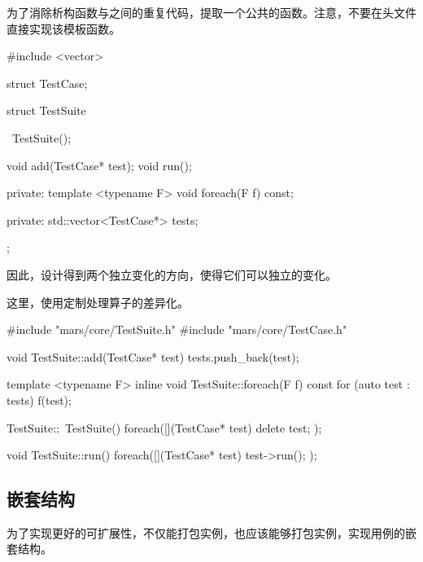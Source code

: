 \begin{content}
为了消除析构函数与之间的重复代码，提取一个公共的函数。注意，不要在头文件直接实现该模板函数。

\begin{leftbar}
 \begin{c++}[caption={\ttfamily{include/mars/core/TestSuite.h}}]
#include <vector>

struct TestCase;

struct TestSuite {
  ~TestSuite();

  void add(TestCase* test);
  void run();

private:
  template <typename F>
  void foreach(F f) const;

private:
  std::vector<TestCase*> tests;
};
 \end{c++}
\end{leftbar}

因此，设计得到两个独立变化的方向，使得它们可以独立的变化。

\begin{enum}
\end{enum}

这里，使用定制处理算子的差异化。

\begin{leftbar}
 \begin{c++}[caption={\ttfamily{src/mars/core/TestSuite.cc}}]
#include "mars/core/TestSuite.h"
#include "mars/core/TestCase.h"

void TestSuite::add(TestCase* test) {
  tests.push_back(test);
}

template <typename F>
inline void TestSuite::foreach(F f) const {
  for (auto test : tests) {
    f(test);
  }
}

TestSuite::~TestSuite() {
  foreach([](TestCase* test) {
    delete test;
  });
}

void TestSuite::run() {
  foreach([](TestCase* test) {
    test->run();
  });
}
 \end{c++}
\end{leftbar}

\subsection{嵌套结构}

为了实现更好的可扩展性，不仅能打包实例，也应该能够打包实例，实现用例的嵌套结构。


\end{content}
